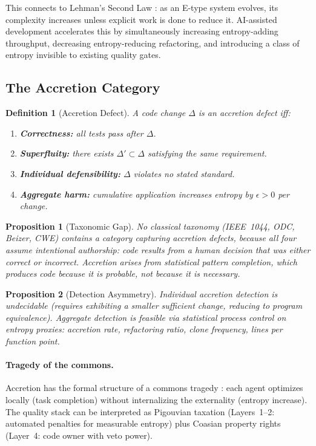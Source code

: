 \documentclass[11pt, a4paper, logo, copyright]{googledeepmind}
\newtheorem{definition}{Definition}[section]
\newtheorem{proposition}{Proposition}[section]
\begin{document}
This connects to Lehman's Second Law \citep{lehman1980}: as an E-type system evolves, its complexity increases unless explicit work is done to reduce it. AI-assisted development accelerates this by simultaneously increasing entropy-adding throughput, decreasing entropy-reducing refactoring, and introducing a class of entropy invisible to existing quality gates.

\subsection{The Accretion Category}

\begin{definition}[Accretion Defect]
\label{def:accretion}
A code change $\Delta$ is an accretion defect iff:
\begin{enumerate}
\item \textbf{Correctness:} all tests pass after $\Delta$.
\item \textbf{Superfluity:} there exists $\Delta' \subset \Delta$ satisfying the same requirement.
\item \textbf{Individual defensibility:} $\Delta$ violates no stated standard.
\item \textbf{Aggregate harm:} cumulative application increases entropy by $\epsilon > 0$ per change.
\end{enumerate}
\end{definition}

\begin{proposition}[Taxonomic Gap]
\label{prop:taxgap}
No classical taxonomy (IEEE~1044, ODC, Beizer, CWE) contains a category capturing accretion defects, because all four assume intentional authorship: code results from a human decision that was either correct or incorrect. Accretion arises from statistical pattern completion, which produces code because it is \emph{probable}, not because it is \emph{necessary}.
\end{proposition}

\begin{proposition}[Detection Asymmetry]
Individual accretion detection is undecidable (requires exhibiting a smaller sufficient change, reducing to program equivalence). Aggregate detection is feasible via statistical process control on entropy proxies: accretion rate, refactoring ratio, clone frequency, lines per function point.
\end{proposition}

\paragraph{Tragedy of the commons.} Accretion has the formal structure of a commons tragedy \citep{hardin1968}: each agent optimizes locally (task completion) without internalizing the externality (entropy increase). The quality stack can be interpreted as Pigouvian taxation (Layers~1--2: automated penalties for measurable entropy) plus Coasian property rights (Layer~4: code owner with veto power).
\end{document}

